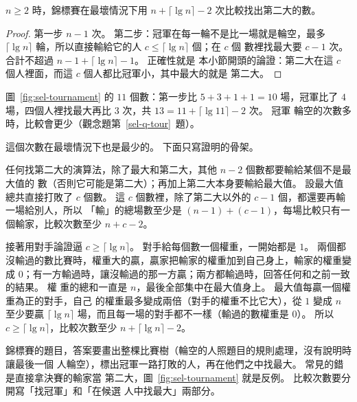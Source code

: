 \begin{theorem}
\label{thm:sel-second}
$n \ge 2$ 時，錦標賽在最壞情況下用 $n + \lceil \lg n \rceil - 2$ 次比較找出第二大的數。
\end{theorem}

\begin{proof}
第一步 $n - 1$ 次。 第二步：冠軍在每一輪不是比一場就是輪空，最多
$\lceil \lg n \rceil$ 輪，所以直接輸給它的人 $c \le \lceil \lg n \rceil$ 個；在 $c$ 個
數裡找最大要 $c - 1$ 次。 合計不超過 $n - 1 + \lceil \lg n \rceil - 1$。 正確性就是
本小節開頭的論證：第二大在這 $c$ 個人裡面，而這 $c$ 個人都比冠軍小，其中最大的就是
第二大。
\end{proof}

圖~\ref{fig:sel-tournament} 的 $11$ 個數：第一步比 $5 + 3 + 1 + 1 = 10$ 場，冠軍比了
$4$ 場，四個人裡找最大再比 $3$ 次，共 $13 = 11 + \lceil \lg 11 \rceil - 2$ 次。 冠軍
輪空的次數多時，比較會更少（觀念題第~\ref{sel-q-tour}~題）。

這個次數在最壞情況下也是最少的。 下面只寫證明的骨架。

\begin{whybox}[找第二大的下界（骨架）]
任何找第二大的演算法，除了最大和第二大，其他 $n - 2$ 個數都要輸給某個不是最大值的
數（否則它可能是第二大）；再加上第二大本身要輸給最大值。 設最大值總共直接打敗了
$c$ 個數。 這 $c$ 個數裡，除了第二大以外的 $c - 1$ 個，都還要再輸一場給別人，所以
「輸」的總場數至少是 $(n - 1) + (c - 1)$，每場比較只有一個輸家，比較次數至少
$n + c - 2$。

接著用對手論證逼 $c \ge \lceil \lg n \rceil$。 對手給每個數一個權重，一開始都是 $1$。
兩個都沒輸過的數比賽時，權重大的贏，贏家把輸家的權重加到自己身上，輸家的權重變成
$0$；有一方輸過時，讓沒輸過的那一方贏；兩方都輸過時，回答任何和之前一致的結果。 權
重的總和一直是 $n$，最後全部集中在最大值身上。 最大值每贏一個權重為正的對手，自己
的權重最多變成兩倍（對手的權重不比它大），從 $1$ 變成 $n$ 至少要贏
$\lceil \lg n \rceil$ 場，而且每一場的對手都不一樣（輸過的數權重是 $0$）。 所以
$c \ge \lceil \lg n \rceil$，比較次數至少 $n + \lceil \lg n \rceil - 2$。
\end{whybox}

\begin{examnote}
錦標賽的題目，答案要畫出整棵比賽樹（輪空的人照題目的規則處理，沒有說明時讓最後一個
人輪空），標出冠軍一路打敗的人，再在他們之中找最大。 常見的錯是直接拿決賽的輸家當
第二大，圖~\ref{fig:sel-tournament} 就是反例。 比較次數要分開寫「找冠軍」和「在候選
人中找最大」兩部分。
\end{examnote}


